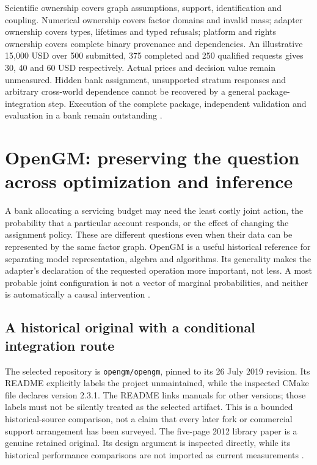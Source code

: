 Scientific ownership covers graph assumptions, support, identification and
coupling. Numerical ownership covers factor domains and invalid mass;
adapter ownership covers types, lifetimes and typed refusals; platform and
rights ownership covers complete binary provenance and dependencies.
An illustrative 15,000 USD over 500 submitted, 375 completed and 250
qualified requests gives 30, 40 and 60 USD respectively. Actual prices and
decision value remain unmeasured. Hidden bank assignment, unsupported
stratum responses and arbitrary cross-world dependence cannot be recovered
by a general package-integration step. Execution of the complete package, independent validation and evaluation in a bank remain outstanding \citep{exec24_agrum_choice}.


\section{OpenGM: preserving the question across optimization and inference}
\label{sec:exec24-opengm-reuse}

A bank allocating a servicing budget may need the least costly joint action,
the probability that a particular account responds, or the effect of changing
the assignment policy. These are different questions even when their data
can be represented by the same factor graph. OpenGM is a useful historical
reference for separating model representation, algebra and algorithms. Its
generality makes the adapter's declaration of the requested operation more
important, not less. A most probable joint configuration is not a vector of
marginal probabilities, and neither is automatically a causal intervention
\citep{exec24_opengm_paper,exec24_opengm_source,exec24_opengm_choice}.

\subsection{A historical original with a conditional integration route}
The selected repository is \texttt{opengm/opengm}, pinned to its 26 July
2019 revision. Its README explicitly labels the project unmaintained, while
the inspected CMake file declares version 2.3.1. The README links manuals
for other versions; those labels must not be silently treated as the
selected artifact. This is a bounded historical-source comparison, not a
claim that every later fork or commercial support arrangement has been
surveyed. The five-page 2012 library paper is a genuine retained original.
Its design argument is inspected directly, while its historical performance
comparisons are not imported as current measurements
\citep{exec24_opengm_paper,exec24_opengm_source}.

